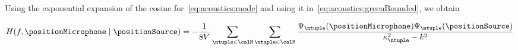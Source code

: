 Using the exponential expansion of the cosine for~\cref{eq:acoustics:mode}
and using it in~\cref{eq:acoustics:greenBounded}, we obtain

\begin{equation}
    H(f, \positionMicrophone \mid \positionSource) =
    - \frac{1}{8 V}
    \sum_{\ntuple \in \calM}
    \sum_{\ntuple \in \calM}
    \frac{\Psi_{\ntuple}(\positionMicrophone)\Psi_{\ntuple}(\positionSource)}{\kappa^2_{\ntuple} - k^2}
\end{equation}%